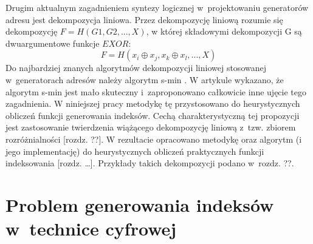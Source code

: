 Drugim aktualnym zagadnieniem syntezy logicznej w~projektowaniu generatorów adresu jest dekompozycja liniowa.
Przez dekompozycję liniową rozumie się dekompozycję $F = H(G1, G2, ...,  X)$,
w której składowymi dekompozycji G są dwuargumentowe funkcje $EXOR$:
\begin{equation}
F = H (x_i \oplus x_j, x_k \oplus x_l, ..., X)
\end{equation}
Do najbardziej znanych algorytmów dekompozycji liniowej stosowanej w~generatorach adresów należy algorytm s-min \cite{sasao-recent, sasao-s-min}.
W artykule \cite{redukcja-kompresja} wykazano, że algorytm s-min jest mało skuteczny i~zaproponowano całkowicie inne ujęcie tego zagadnienia.
W niniejszej pracy metodykę tę przystosowano do heurystycznych obliczeń funkcji generowania indeksów.
Cechą charakterystyczną tej propozycji jest zastosowanie twierdzenia wiążącego dekompozycję liniową z~tzw. zbiorem rozróżnialności [rozdz. ??].
W rezultacie opracowano metodykę oraz algorytm (i jego implementację) do heurystycznych obliczeń praktycznych funkcji indeksowania [rozdz. …].
Przykłady takich dekompozycji podano w~rozdz. ??.

\section{Problem generowania indeksów w~technice cyfrowej}

